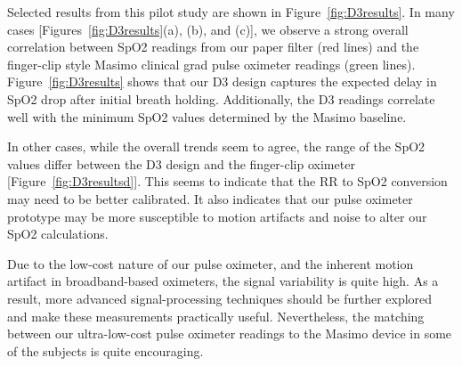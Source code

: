 Selected results from this pilot study are shown in Figure~\ref{fig:D3results}. In many cases [Figures~\ref{fig:D3results}(a), (b), and (c)], we observe a strong overall correlation between SpO2 readings from our paper filter (red lines) and the finger-clip style Masimo clinical grad pulse oximeter readings (green lines). Figure~\ref{fig:D3results} shows that our D3 design captures the expected delay in SpO2 drop after initial breath holding. Additionally, the D3 readings correlate well with the minimum SpO2 values determined by the Masimo baseline. 

In other cases, while the overall trends seem to agree, the range of the SpO2 values differ between the D3 design and the finger-clip oximeter [Figure~\ref{fig:D3resultsd}]. This seems to indicate that the RR to SpO2 conversion may need to be better calibrated. It also indicates that our pulse oximeter prototype may be more susceptible to motion artifacts and noise to alter our SpO2 calculations. 

Due to the low-cost nature of our pulse oximeter, and the inherent motion artifact in broadband-based oximeters, the signal variability is quite high. As a result, more advanced signal-processing techniques should be further explored and make these measurements practically useful. Nevertheless, the matching between our ultra-low-cost pulse oximeter readings to the Masimo device in some of the subjects is quite encouraging. 


